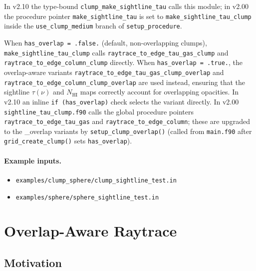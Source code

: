 \documentclass[english,a4paper]{my_memo}
\begin{document}
\begin{sloppypar}
In v2.10 the type-bound \texttt{clump\_make\_sightline\_tau} calls this
module; in v2.00 the procedure pointer \texttt{make\_sightline\_tau} is
set to \texttt{make\_sightline\_tau\_clump} inside the
\texttt{use\_clump\_medium} branch of \texttt{setup\_procedure}.

When \texttt{has\_overlap = .false.} (default, non-overlapping clumps),
\texttt{make\_sightline\_tau\_clump} calls
\texttt{raytrace\_to\_edge\_tau\_gas\_clump} and
\texttt{raytrace\_to\_edge\_column\_clump} directly.
When \texttt{has\_overlap = .true.}, the overlap-aware variants
\texttt{raytrace\_to\_edge\_tau\_gas\_clump\_overlap} and
\texttt{raytrace\_to\_edge\_column\_clump\_overlap} are used instead,
ensuring that the sightline $\tau(\nu)$ and $N_\mathrm{HI}$ maps
correctly account for overlapping opacities.  In v2.10 an inline
\texttt{if (has\_overlap)} check selects the variant directly.
In v2.00 \texttt{sightline\_tau\_clump.f90} calls the global procedure
pointers \texttt{raytrace\_to\_edge\_tau\_gas} and
\texttt{raytrace\_to\_edge\_column}; these are upgraded to the \_overlap
variants by \texttt{setup\_clump\_overlap()} (called from \texttt{main.f90}
after \texttt{grid\_create\_clump()} sets \texttt{has\_overlap}).
\end{sloppypar}

\paragraph{Example inputs.}
\begin{itemize}
\item \texttt{examples/clump\_sphere/clump\_sightline\_test.in}
\item \texttt{examples/sphere/sphere\_sightline\_test.in}
\end{itemize}

\section{Overlap-Aware Raytrace}
\label{sec:overlap}

\subsection{Motivation}
\end{document}
